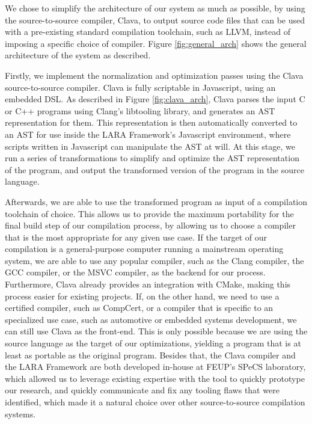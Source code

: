 We chose to simplify the architecture of our system as much as possible, by using the source-to-source compiler, Clava, to output source code files that can be used with a pre-existing standard compilation toolchain, such as LLVM, instead of imposing a specific choice of compiler. Figure \ref{fig:general_arch} shows the general architecture of the system as described.

Firstly, we implement the normalization and optimization passes using the Clava source-to-source compiler. Clava is fully scriptable in Javascript, using an embedded DSL. As described in Figure \ref{fig:clava_arch}, Clava parses the input C or C++ programs using Clang's libtooling library, and generates an AST representation for them. This representation is then automatically converted to an AST for use inside the LARA Framework's Javascript environment, where scripts written in Javascript can manipulate the AST at will. At this stage, we run a series of transformations to simplify and optimize the AST representation of the program, and output the transformed version of the program in the source language.

Afterwards, we are able to use the transformed program as input of a compilation toolchain of choice. This allows us to provide the maximum portability for the final build step of our compilation process, by allowing us to choose a compiler that is the most appropriate for any given use case. If the target of our compilation is a general-purpose computer running a mainstream operating system, we are able to use any popular compiler, such as the Clang compiler, the GCC compiler, or the MSVC compiler, as the backend for our process. Furthermore, Clava already provides an integration with CMake, making this process easier for existing projects. If, on the other hand, we need to use a certified compiler, such as CompCert, or a compiler that is specific to an specialized use case, such as automotive or embedded systems development, we can still use Clava as the front-end. This is only possible because we are using the source language as the target of our optimizations, yielding a program that is at least as portable as the original program. Besides that, the Clava compiler and the LARA Framework are both developed in-house at FEUP's SPeCS laboratory, which allowed us to leverage existing expertise with the tool to quickly prototype our research, and quickly communicate and fix any tooling flaws that were identified, which made it a natural choice over other source-to-source compilation systems.

